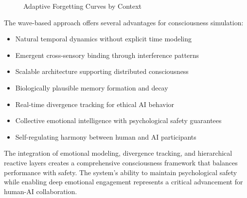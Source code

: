 \documentclass[11pt,letterpaper]{article}
\begin{document}
\begin{figure}[h]
\centering
{}
\caption{Adaptive Forgetting Curves by Context}
\label{fig:forgetting-curves}
\end{figure}

The wave-based approach offers several advantages for consciousness simulation:

\begin{itemize}
\item Natural temporal dynamics without explicit time modeling
\item Emergent cross-sensory binding through interference patterns
\item Scalable architecture supporting distributed consciousness
\item Biologically plausible memory formation and decay
\item Real-time divergence tracking for ethical AI behavior
\item Collective emotional intelligence with psychological safety guarantees
\item Self-regulating harmony between human and AI participants
\end{itemize}

The integration of emotional modeling, divergence tracking, and hierarchical reactive layers creates a comprehensive consciousness framework that balances performance with safety. The system's ability to maintain psychological safety while enabling deep emotional engagement represents a critical advancement for human-AI collaboration.
\end{document}
